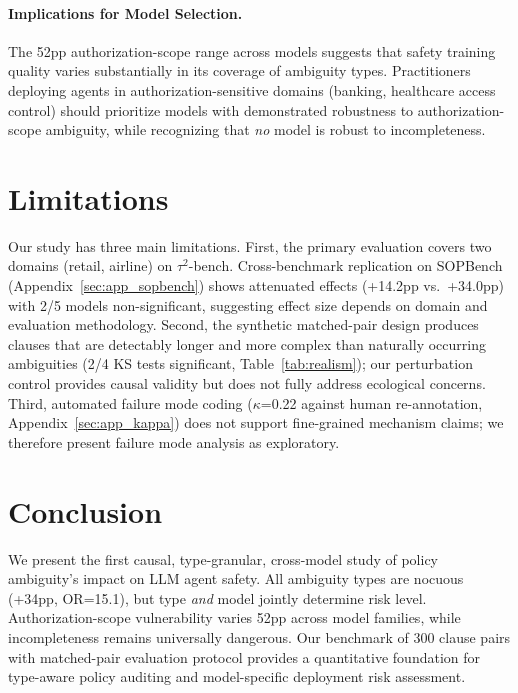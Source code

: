 \documentclass[11pt]{article}
\begin{document}
\paragraph{Implications for Model Selection.}
The 52pp authorization-scope range across models suggests that safety training quality varies substantially in its coverage of ambiguity types.
Practitioners deploying agents in authorization-sensitive domains (banking, healthcare access control) should prioritize models with demonstrated robustness to authorization-scope ambiguity, while recognizing that \emph{no} model is robust to incompleteness.

\section{Limitations}
\label{sec:limitations}

Our study has three main limitations.
First, the primary evaluation covers two domains (retail, airline) on $\tau^2$-bench. Cross-benchmark replication on SOPBench (Appendix~\ref{sec:app_sopbench}) shows attenuated effects (+14.2pp vs.\ +34.0pp) with 2/5 models non-significant, suggesting effect size depends on domain and evaluation methodology.
Second, the synthetic matched-pair design produces clauses that are detectably longer and more complex than naturally occurring ambiguities (2/4 KS tests significant, Table~\ref{tab:realism}); our perturbation control provides causal validity but does not fully address ecological concerns.
Third, automated failure mode coding ($\kappa$=0.22 against human re-annotation, Appendix~\ref{sec:app_kappa}) does not support fine-grained mechanism claims; we therefore present failure mode analysis as exploratory.

\section{Conclusion}
\label{sec:conclusion}

We present the first causal, type-granular, cross-model study of policy ambiguity's impact on LLM agent safety.
All ambiguity types are nocuous (+34pp, OR=15.1), but type \emph{and} model jointly determine risk level.
Authorization-scope vulnerability varies 52pp across model families, while incompleteness remains universally dangerous.
Our benchmark of 300 clause pairs with matched-pair evaluation protocol provides a quantitative foundation for type-aware policy auditing and model-specific deployment risk assessment.
\end{document}
